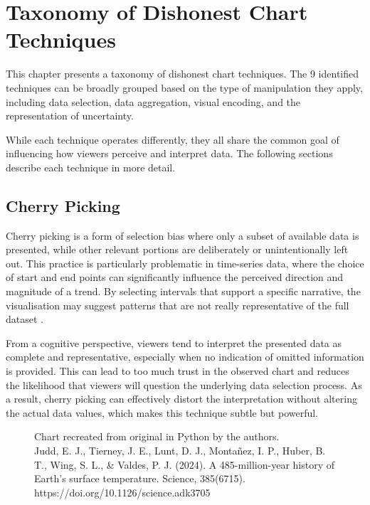 %
%
% 
% 
% 

\chapter{Taxonomy of Dishonest Chart Techniques}
\label{chap:Taxonomy}

This chapter presents a taxonomy of dishonest chart techniques. The 9 identified techniques can be broadly grouped based on the type of manipulation they apply, including data selection, data aggregation, visual encoding, and the representation of uncertainty.

While each technique operates differently, they all share the common goal of influencing how viewers perceive and interpret data. The following sections describe each technique in more detail.

\newpage
\section{Cherry Picking}
Cherry picking is a form of selection bias where only a subset of available data is presented, while other relevant portions are deliberately or unintentionally left out. This practice is particularly problematic in time-series data, where the choice of start and end points can significantly influence the perceived direction and magnitude of a trend. By selecting intervals that support a specific narrative, the visualisation may suggest patterns that are not really representative of the full dataset \cite{cairo2019}.

From a cognitive perspective, viewers tend to interpret the presented data as complete and representative, especially when no indication of omitted information is provided. This can lead to too much trust in the observed chart and reduces the likelihood that viewers will question the underlying data selection process. As a result, cherry picking can effectively distort the interpretation without altering the actual data values, which makes this technique subtle but powerful.

\begin{figure}[htbp]
    \centering
    
    \caption[Climate Reconstruction Chart]{Chart recreated from original in Python by the authors. \\
    Judd, E. J., Tierney, J. E., Lunt, D. J., Montañez, I. P., Huber, B. T., Wing, S. L., \& Valdes, P. J. (2024). A 485-million-year history of Earth’s surface temperature. Science, 385(6715). https://doi.org/10.1126/science.adk3705}
    \label{fig:cherry_picking}
\end{figure}

